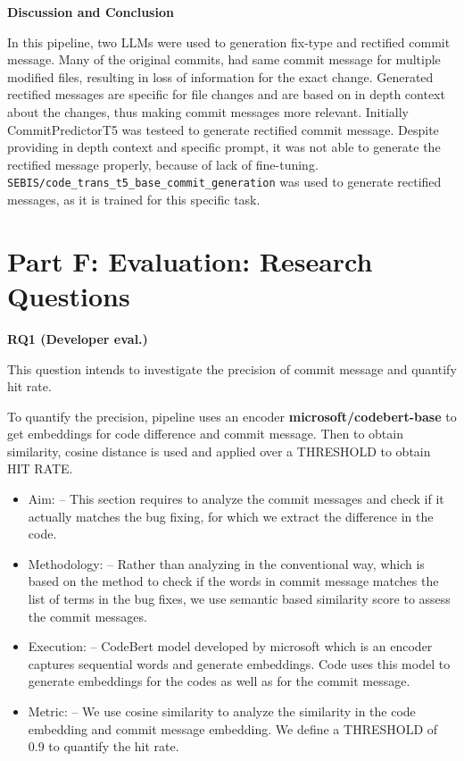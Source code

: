 \documentclass[12pt, a4paper]{report}
\newcommand{\sectionbar}[1]{%
  \vspace{0.6\baselineskip}%
  \noindent
  \colorbox{sectionbar}{%
    \parbox{\dimexpr\linewidth-2\fboxsep\relax}{%
      \textbf{\Large\textsf{#1}}%
    }%
  }%
  \vspace{0.6\baselineskip}
}
\begin{document}
\newpage

\sectionbar{Discussion and Conclusion}


In this pipeline, two LLMs were used to generation fix-type and rectified commit message. 
Many of the original commits, had same commit message for multiple modified files, resulting in loss of information for the exact change. Generated rectified messages are specific for file changes and are based on in depth context about the changes, thus making commit messages more relevant.
\newline
Initially CommitPredictorT5 was testeed to generate rectified commit message. Despite providing in depth context and specific prompt, it was not able to generate the rectified message properly, because of lack of fine-tuning.
\texttt{SEBIS/code\_trans\_t5\_base\_commit\_generation} was used to generate rectified messages, as it is trained for this specific task.
\cleardoublepage

\section{Part F: Evaluation: Research Questions}

\textbf{RQ1 (Developer eval.)}

This question intends to investigate the precision of commit message and quantify hit rate.

To quantify the precision, pipeline uses an encoder \textbf{microsoft/codebert-base} to get embeddings for code difference and commit message. Then to obtain similarity, cosine distance is used and applied over a THRESHOLD to obtain HIT RATE.



\begin{itemize}
    \item {Aim:} -- This section requires to analyze the commit messages and check if it actually matches the bug fixing, for which we extract the difference in the code.
    \item {Methodology:} -- Rather than analyzing in the conventional way, which is based on the method to check if the words in commit message matches the list of terms in the bug fixes, we use semantic based similarity score to assess the commit messages.
    \item {Execution:} -- CodeBert model developed by microsoft which is an encoder captures sequential words and generate embeddings. Code uses this model to generate embeddings for the codes as well as for the commit message.
    \item {Metric: } -- We use cosine similarity to analyze the similarity in the code embedding and commit message embedding. We define a THRESHOLD of 0.9 to quantify the hit rate. 
\end{itemize}
\end{document}
